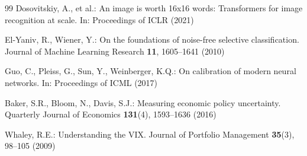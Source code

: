 \documentclass[runningheads]{llncs}
\begin{document}
\begin{thebibliography}{99}
Dosovitskiy, A., et al.: An image is worth 16x16 words: Transformers for
image recognition at scale. In: Proceedings of ICLR (2021)

El-Yaniv, R., Wiener, Y.: On the foundations of noise-free selective
classification. Journal of Machine Learning Research \textbf{11},
1605--1641 (2010)

Guo, C., Pleiss, G., Sun, Y., Weinberger, K.Q.: On calibration of modern
neural networks. In: Proceedings of ICML (2017)

Baker, S.R., Bloom, N., Davis, S.J.: Measuring economic policy
uncertainty. Quarterly Journal of Economics \textbf{131}(4), 1593--1636
(2016)

Whaley, R.E.: Understanding the VIX. Journal of Portfolio Management
\textbf{35}(3), 98--105 (2009)

\end{thebibliography}
\end{document}

